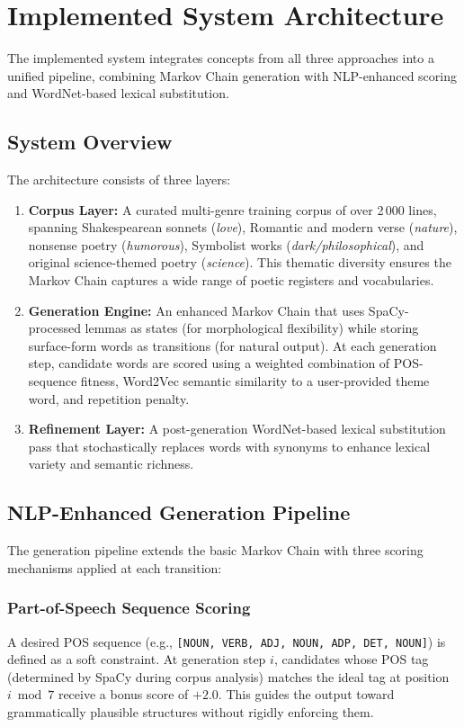 \documentclass[conference]{IEEEtran}
\begin{document}
\section{Implemented System Architecture}
\label{sec:system}

The implemented system integrates concepts from all three approaches into a unified pipeline, combining Markov Chain generation with NLP-enhanced scoring and WordNet-based lexical substitution.

\subsection{System Overview}

The architecture consists of three layers:

\begin{enumerate}
    \item \textbf{Corpus Layer:} A curated multi-genre training corpus of over 2\,000 lines, spanning Shakespearean sonnets (\textit{love}), Romantic and modern verse (\textit{nature}), nonsense poetry (\textit{humorous}), Symbolist works (\textit{dark/philosophical}), and original science-themed poetry (\textit{science}). This thematic diversity ensures the Markov Chain captures a wide range of poetic registers and vocabularies.
    \item \textbf{Generation Engine:} An enhanced Markov Chain that uses SpaCy-processed lemmas as states (for morphological flexibility) while storing surface-form words as transitions (for natural output). At each generation step, candidate words are scored using a weighted combination of POS-sequence fitness, Word2Vec semantic similarity to a user-provided theme word, and repetition penalty.
    \item \textbf{Refinement Layer:} A post-generation WordNet-based lexical substitution pass that stochastically replaces words with synonyms to enhance lexical variety and semantic richness.
\end{enumerate}

\subsection{NLP-Enhanced Generation Pipeline}

The generation pipeline extends the basic Markov Chain with three scoring mechanisms applied at each transition:

\subsubsection{Part-of-Speech Sequence Scoring}
A desired POS sequence (e.g., \texttt{[NOUN, VERB, ADJ, NOUN, ADP, DET, NOUN]}) is defined as a soft constraint. At generation step $i$, candidates whose POS tag (determined by SpaCy during corpus analysis) matches the ideal tag at position $i \bmod 7$ receive a bonus score of $+2.0$. This guides the output toward grammatically plausible structures without rigidly enforcing them.
\end{document}
